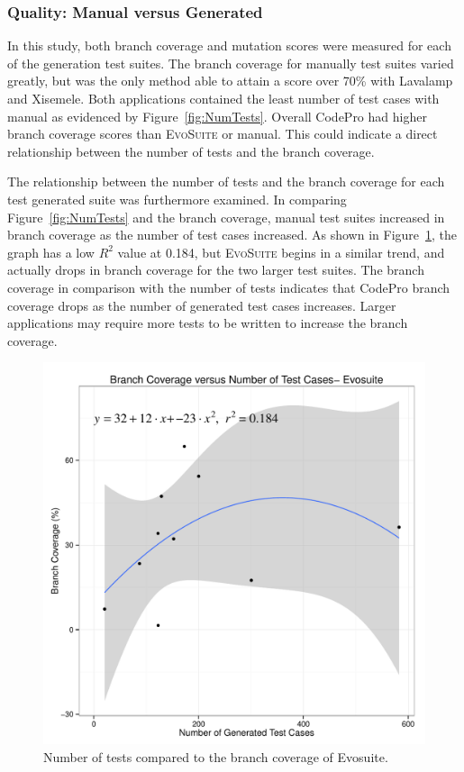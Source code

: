 \subsubsection{Quality: Manual versus Generated}
In this study, both branch coverage and mutation scores were measured for each of the generation test suites. The branch coverage for manually test suites varied greatly, but was the only method  able to attain a score over 70\% with Lavalamp and Xisemele. Both applications contained the least number of test cases with manual as evidenced by  Figure~\ref{fig:NumTests}. Overall CodePro had higher branch coverage scores than \textsc{EvoSuite} or manual. This could indicate a direct relationship between the number of tests and the branch coverage. 

The relationship between the number of tests and the branch coverage for each test generated suite was furthermore examined. In comparing Figure~\ref{fig:NumTests} and the branch coverage, manual test suites increased in branch coverage as the number of test cases increased. As shown in Figure~\ref{fig:NumTestsvsBranchCov}, the graph has a low  $R^2$ value at 0.184, but \textsc{EvoSuite} begins in a similar trend, and actually drops in branch coverage for the two larger test suites. The branch coverage in comparison with the number of tests indicates that CodePro branch coverage drops as the number of generated test cases increases. Larger applications may require more tests to be written to increase the branch coverage. 

\begin{figure}[!t]
\centering
  \includegraphics[width=\linewidth]{RGraphs/Evosuite_TestsVersusBranchCov_poly.pdf}
    \caption{Number of tests compared to the branch coverage of Evosuite.}
  \label{fig:NumTestsvsBranchCov}
\end{figure}

